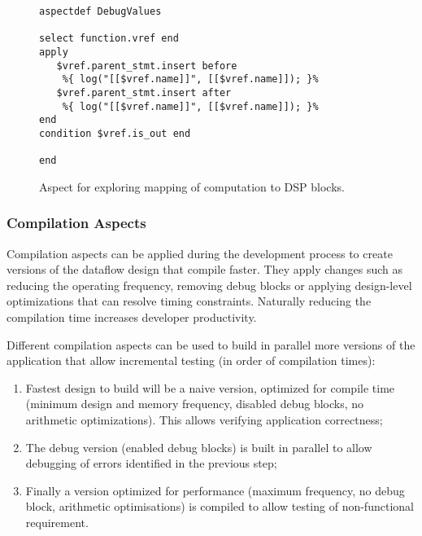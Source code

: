 \lstset{style=lara}
\begin{figure}[!h]
  \centering
\begin{lstlisting}
aspectdef DebugValues
    
select function.vref end
apply
   $vref.parent_stmt.insert before 
    %{ log("[[$vref.name]]", [[$vref.name]]); }%
   $vref.parent_stmt.insert after 
    %{ log("[[$vref.name]]", [[$vref.name]]); }%
end
condition $vref.is_out end

end
\end{lstlisting}
  \caption{Aspect for exploring mapping of computation to DSP blocks.}
  \label{fig:aspect-DSP}
\end{figure}

\subsubsection{Compilation Aspects}

Compilation aspects can be applied during the development process to
create versions of the dataflow design that compile faster. They apply
changes such as reducing the operating frequency, removing debug
blocks or applying design-level optimizations that can resolve timing
constraints. Naturally reducing the compilation time increases
developer productivity.

Different compilation aspects can be used to build in parallel more
versions of the application that allow incremental testing (in order
of compilation times):
\begin{enumerate}
\item Fastest design to build will be a naive version, optimized for
  compile time (minimum design and memory frequency, disabled debug
  blocks, no arithmetic optimizations). This allows verifying
  application correctness;
\item The debug version (enabled debug blocks) is built in parallel to
  allow debugging of errors identified in the previous step;
\item Finally a version optimized for performance (maximum frequency,
  no debug block, arithmetic optimisations) is compiled to allow
  testing of non-functional requirement.
\end{enumerate}
